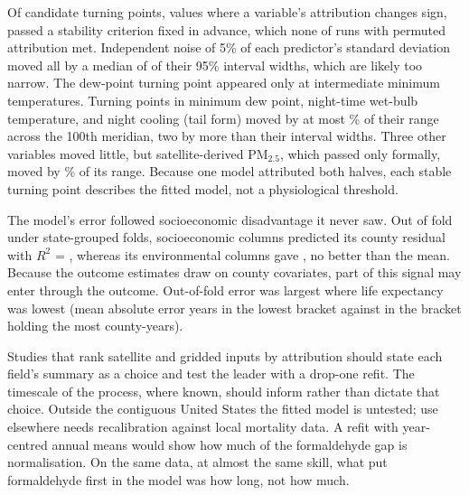 \documentclass[sensors,article,submit,moreauthors,pdftex]{Definitions/mdpi}
\begin{document}
Of \TpTotal{} candidate turning points, values where a
variable's attribution changes sign, \TpStable{} passed a stability criterion
fixed in advance, which none of \NullCrossTotal{} runs with permuted
attribution met. Independent noise of 5\% of each predictor's standard deviation moved all \TpTotal{}
by a median of \PertFiveMed{} of their 95\% interval widths, which are likely too narrow. The dew-point turning point appeared only at intermediate minimum temperatures. Turning points in minimum
dew point, night-time wet-bulb temperature, and night cooling (tail form)
moved by at most \RegMerTripletMax{}\% of their range across the 100th
meridian, two by more than their interval widths. Three other variables moved little, but satellite-derived PM$_{2.5}$, which passed only formally, moved by \RegMerPm{}\% of its range. Because one
model attributed both halves, each stable turning point describes the fitted
model, not a physiological threshold.

The model's error followed
socioeconomic disadvantage it never saw. Out of fold under state-grouped folds, \ResSdohN{} socioeconomic columns
predicted its county residual
with $R^{2}$ = \ResSdohRtwo{}, whereas its
environmental columns gave \ResEnvRtwo{}, no better than the mean. Because the outcome
estimates draw on county covariates, part of this signal may enter through the
outcome. Out-of-fold error was largest where life expectancy was lowest (mean absolute
error \BrLowMAE{} years in the lowest bracket against
\BrMidMAE{} in the bracket holding the most county-years).

Studies that rank satellite and gridded inputs by attribution should state
each field's summary as a choice and test the leader with a drop-one refit. The timescale of the
process, where known, should inform rather than dictate that choice.
Outside the
contiguous United States the fitted model is untested;
use elsewhere
needs recalibration against local mortality data. A
refit with year-centred annual means would show how much of the formaldehyde
gap is normalisation. On the same
data, at almost the same skill, what put formaldehyde first in the model was how long, not
how much.

\vspace{6pt}


\end{document}
